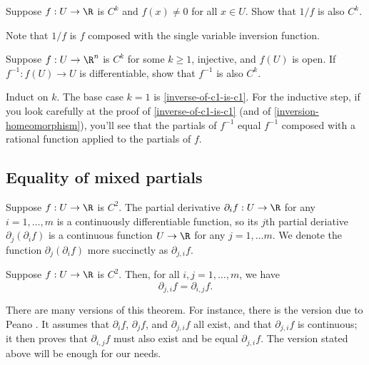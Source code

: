 \begin{exercise}
	Suppose $f : U \to \R$ is $C^k$ and $f(x) \neq 0$ for all $x \in U$. Show that $1/f$ is also $C^k$.
	\begin{hint}
		Note that $1/f$ is $f$ composed with the single variable inversion function. 
	\end{hint}
\end{exercise}

\begin{exercise}
	Suppose $f : U \to \R^n$ is $C^k$ for some $k \geq 1$, injective, and $f(U)$ is open. If $f^{-1} : f(U) \to U$ is differentiable, show that $f^{-1}$ is also $C^k$. 
	\begin{hint}
		Induct on $k$. The base case $k = 1$ is \cref{inverse-of-c1-is-c1}. For the inductive step, if you look carefully at the proof of \cref{inverse-of-c1-is-c1} (and of  \cref{inversion-homeomorphism}), you'll see that the partials of $f^{-1}$ equal $f^{-1}$ composed with a rational function applied to the partials of $f$. 
	\end{hint}
\end{exercise}

\subsection{Equality of mixed partials}

\begin{definition}
	Suppose $f : U \to \R$ is $C^2$. The partial derivative $\partial_i f : U \to \R$ for any $i = 1, \dotsc, m$ is a continuously differentiable function, so its $j$th partial deriative $\partial_j( \partial_i f)$ is a continuous function $U \to \R$ for any $j = 1, \dotsc m$. We denote the function $\partial_j(\partial_i f)$ more succinctly as $\partial_{j,i} f$. 
\end{definition}

\begin{theorem} \label{mixed-partials}
	Suppose $f : U \to \R$ is $C^2$. Then, for all $i, j = 1, \dotsc, m$, we have \[ \partial_{j,i} f = \partial_{i,j} f. \] 
\end{theorem}


\begin{remark}
	There are many versions of this theorem. For instance, there is the version due to Peano \cite[theorem 9.41]{rudin}. It assumes that $\partial_i f$, $\partial_j f$, and $\partial_{j,i} f$ all exist, and that $\partial_{j,i} f$ is continuous; it then proves that $\partial_{i,j} f$ must also exist and be equal $\partial_{j,i} f$. The version stated above will be enough for our needs. 
\end{remark}

